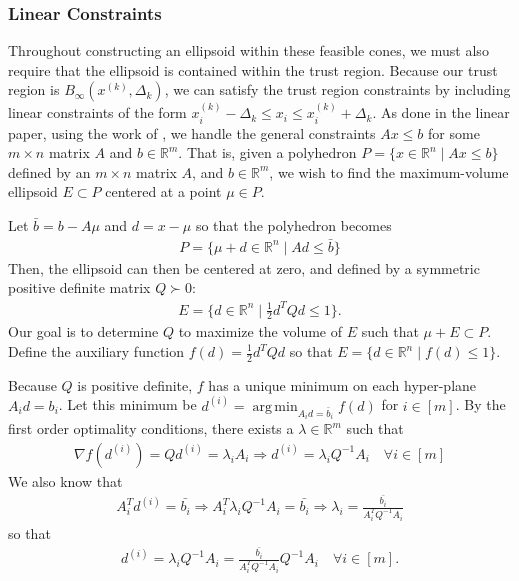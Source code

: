 \documentclass{article}
\theoremstyle{case}
\numberwithin{theorem}{subsection}
\DeclareMathOperator*{\argmin}{arg\,min}
\newcommand{\dk}{\Delta_k}
\newcommand{\gradf}{\nabla f}
\newcommand{\Rm}{\mathbb R^m}
\newcommand{\Rn}{\mathbb R^n}
\newcommand{\tr}{{ B_{\infty}\left(\xk, \dk\right) }}
\newcommand{\xk}{x^{(k)}}
\begin{document}
\subsubsection{Linear Constraints}

Throughout constructing an ellipsoid within these feasible cones, we must also require that the ellipsoid is contained within the trust region.
Because our trust region is $\tr$, we can satisfy the trust region constraints by including linear constraints of the form $\xk_i - \dk \le x_i \le \xk_i + \dk$.
As done in the linear paper, using the work of \cite{Khachiyan1993}, we handle the general constraints $Ax \le b$ for some $m\times n$ matrix $A$ and $b \in \Rm$.
That is, given a polyhedron $P = \{ x \in \Rn\; | \;  Ax \le b \}$ defined by an $m \times n$ matrix $A$, and $b \in \Rm$,
we wish to find the maximum-volume ellipsoid $E \subset P$ centered at a point $\mu \in P$.

Let $\bar{b} = b - A\mu$ and $d = x - \mu$ so that the polyhedron becomes
\begin{align*}
P = \{ \mu + d \in \Rn \; | \;  Ad \le \bar{b} \}
\end{align*}
Then, the ellipsoid can then be centered at zero, and defined by a symmetric positive definite matrix $Q \succ 0$:
\begin{align*}
E = \{ d \in \Rn \; | \; \frac 1 2 d^T Q d \le 1 \}.
\end{align*}
Our goal is to determine $Q$ to maximize the volume of $E$ such that $\mu + E \subset P$.
Define the auxiliary function $f(d) = \frac 1 2 d^T Q d$ so that $E = \{ d \in \Rn\; | \; f(d) \le 1 \}$.

Because $Q$ is positive definite, $f$ has a unique minimum on each hyper-plane $A_i d = b_i$.
Let this minimum be $d^{(i)} = \argmin_{A_id =\bar{b}_i} f(d)$ for $i \in [m]$.
By the first order optimality conditions, there exists a $\lambda \in \Rm$ such that
\begin{align*}
\gradf(d^{(i)}) = Q d^{(i)} = \lambda_i A_i 
\Longrightarrow d^{(i)} = \lambda_i Q^{-1}A_i \quad \forall i \in [m]
\end{align*}
We also know that
\begin{align*}
A_i^T d^{(i)} = \bar{b_i} \Longrightarrow
A_i^T \lambda_i Q^{-1}A_i = \bar{b_i} \Longrightarrow
\lambda_i = \frac {\bar{b_i}}{A_i^T  Q^{-1}A_i}
\end{align*}
so that
\begin{align*}
d^{(i)} = \lambda_i Q^{-1}A_i = \frac {\bar{b_i}}{A_i^T  Q^{-1}A_i}  Q^{-1}A_i \quad \forall i \in [m].
\end{align*}
\end{document}
